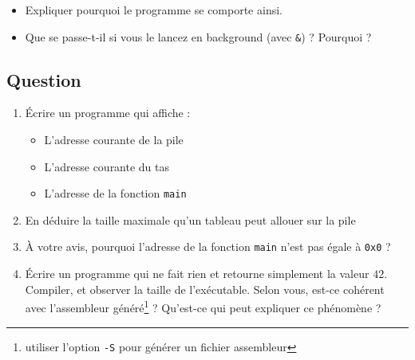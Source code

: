 \documentclass[11pt]{article}
\newcounter{questionc}
\newcommand{\question}{\stepcounter{questionc}\subsection{Question \thequestionc}}
\begin{document}
\begin{itemize}
\item Expliquer pourquoi le programme se comporte ainsi.
\item Que se passe-t-il si vous le lancez en background (avec \texttt{&}) ? Pourquoi ?
\end{itemize}

\question

\begin{enumerate}
\item Écrire un programme qui affiche :
  \begin{itemize}
  \item L'adresse courante de la pile
  \item L'adresse courante du tas
  \item L'adresse de la fonction \texttt{main}
  \end{itemize}
\item En déduire la taille maximale qu'un tableau peut allouer sur la pile
\item À votre avis, pourquoi l'adresse de la fonction \texttt{main} n'est pas égale à \texttt{0x0} ?
\item Écrire un programme qui ne fait rien et retourne simplement la valeur \(42\). Compiler, et observer la taille de l'exécutable. Selon vous, est-ce cohérent avec l'assembleur généré\footnote{utiliser l'option \texttt{-S} pour générer un fichier assembleur} ? Qu'est-ce qui peut expliquer ce phénomène ?
\end{enumerate}
\end{document}

